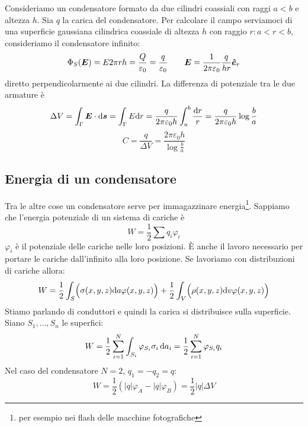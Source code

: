 \begin{Es}[cilindrico]
Consideriamo un condensatore formato da due cilindri coassiali con raggi $a<b$ e altezza $h$. Sia $q$ la carica del condensatore. Per calcolare il campo serviamoci di una superficie gaussiana cilindrica coassiale di altezza $h$ con raggio $r:a<r<b$, consideriamo il condensatore infinito:
\begin{equation*}\Phi_S(\boldsymbol{E})=E2\pi rh=\frac{Q}{\varepsilon_0}=\frac{q}{\varepsilon_0}\qquad \boldsymbol{E}=\frac{1}{2\pi\varepsilon_0}\frac{q}{hr}\boldsymbol{\hat {e}}_r\end{equation*}
diretto perpendicolarmente ai due cilindri. La differenza di potenziale tra le due armature è 
\begin{equation*}\Delta V=\int_\Gamma\boldsymbol{E}\cdot\mathrm{d}\boldsymbol{s}=\int_\Gamma E\mathrm{d} r=\frac{q}{2\pi\varepsilon_0h}\int_a^b\frac{\mathrm{d} r}{r}=\frac{q}{2\pi\varepsilon_0h}\log\frac{b}{a}\end{equation*}
\begin{equation*}C=\frac{q}{\Delta V}=\frac{2\pi\varepsilon_0h}{\log\frac{b}{a}}\end{equation*}
\end{Es}
\subsection{Energia di un condensatore}
Tra le altre cose un condensatore serve per immagazzinare energia\footnote{per esempio nei flash delle macchine fotografiche}. Sappiamo che l'energia potenziale di un sistema di cariche è 
\begin{equation*}W=\frac{1}{2}\sum q_i\varphi_i\end{equation*}
$\varphi_i$ è il potenziale delle cariche nelle loro posizioni. \`E anche il lavoro necessario per portare le cariche dall'infinito alla loro posizione. Se lavoriamo con distribuzioni di cariche allora:
\begin{equation*}W=\frac{1}{2}\int_S\Bigl(\sigma(x,y,z)\mathrm{d} a\varphi(x,y,z)\Bigr)+\frac{1}{2}\int_V\Bigl(\rho(x,y,z)\mathrm{d} v\varphi(x,y,z)\Bigr)\end{equation*}
Stiamo parlando di conduttori e quindi la carica si distribuisce sulla superficie. Siano $S_1,\ldots,S_n$ le superfici:
\begin{equation*}W=\frac{1}{2}\sum_{i=1}^N\int_{S_i}\varphi_{S_i}\sigma_i\,\mathrm{d} a_i=\frac{1}{2}\sum_{i=1}^N\varphi_{S_i}q_{i}\end{equation*}
Nel caso del condensatore $N=2$, $q_1=-q_2=q$:
\begin{equation*}W=\frac{1}{2}\left(|q|\varphi_A-|q|\varphi_B\right)=\frac{1}{2}|q|\Delta V\end{equation*}

